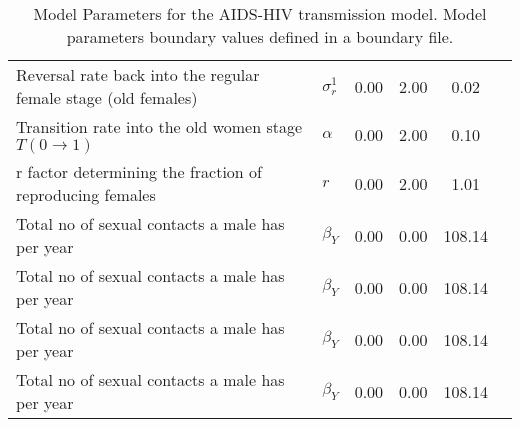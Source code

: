 \begin{table}
\begin{tabular}{p{5cm}lcccc}
Reversal rate back into the regular female stage (old females) & $\sigma^1_r$ & 0.00 & 2.00 & 0.02\\
Transition rate into the old women stage $T(0\rightarrow 1)$ & $\alpha$ & 0.00 & 2.00 & 0.10\\
r factor determining the fraction of reproducing females & $r$ & 0.00 & 2.00 & 1.01\\
Total no of sexual contacts a male has per year & $\beta_Y$ & 0.00 & 0.00 & 108.14\\
Total no of sexual contacts a male has per year & $\beta_Y$ & 0.00 & 0.00 & 108.14\\
Total no of sexual contacts a male has per year & $\beta_Y$ & 0.00 & 0.00 & 108.14\\
Total no of sexual contacts a male has per year & $\beta_Y$ & 0.00 & 0.00 & 108.14\\
\hline\hline
\end{tabular}
\caption{Model Parameters for the AIDS-HIV transmission model. Model parameters boundary values defined in a boundary file.}
\end{table}
